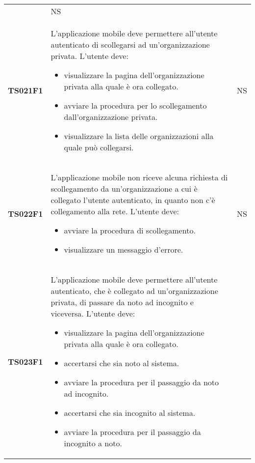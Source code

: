 \documentclass[../piano-di-qualifica.tex]{subfiles}
\begin{document}
\begin{centering}
\begin{longtable}[H]{>{\centering\bfseries}m{3cm} >{}p{10cm} >{\centering\arraybackslash}m{3cm}}
\begin{itemize}
                      \end{itemize}
                    & NS \\
        TS021F1     & L'applicazione mobile deve permettere all'utente autenticato di scollegarsi ad un'organizzazione privata. \newline
                      L'utente deve:
                      \begin{itemize}
                        \item visualizzare la pagina dell'organizzazione privata alla quale è ora collegato.
                        \item avviare la procedura per lo scollegamento dall'organizzazione privata.
                        \item visualizzare la lista delle organizzazioni alla quale può collegarsi.
                      \end{itemize}
                    & NS \\
        TS022F1     & L'applicazione mobile non riceve alcuna richiesta di scollegamento da un'organizzazione a cui è collegato l'utente autenticato, in quanto non c'è collegamento alla rete. \newline
                      L'utente deve:
                      \begin{itemize}
                        \item avviare la procedura di scollegamento.
                        \item visualizzare un messaggio d'errore.
                      \end{itemize}
                    & NS \\
        TS023F1     & L'applicazione mobile deve permettere all'utente autenticato, che è collegato ad un'organizzazione privata, di passare da noto ad incognito e viceversa. \newline
                      L'utente deve:
                      \begin{itemize}
                        \item visualizzare la pagina dell'organizzazione privata alla quale è ora collegato.
                        \item accertarsi che sia noto al sistema.
                        \item avviare la procedura per il passaggio da noto ad incognito.
                        \item accertarsi che sia incognito al sistema.
                        \item avviare la procedura per il passaggio da incognito a noto.

\end{itemize}
\end{longtable}
\end{centering}
\end{document}
